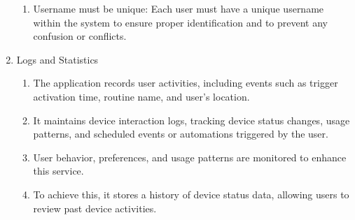 \begin{enumerate}[label=\arabic*.]
\begin{enumerate}[label*={\arabic*.},ref=\theenumi.\arabic*]
                  \item Username must be unique: Each user must have a unique username within the system to ensure proper identification and to prevent any confusion or conflicts.\\
            \end{enumerate}

      \item {\large{Logs and Statistics}}\\
            \begin{enumerate}[label*={\arabic*.},ref=\theenumi.\arabic*]
                  \setlength{\itemindent}{0.5cm}
                  \item The application records user activities, including events such as trigger activation time, routine name, and user's location. \\

                  \item It maintains device interaction logs, tracking device status changes, usage patterns, and scheduled events or automations triggered by the user. \\


                  \item User behavior, preferences, and usage patterns are monitored to enhance this service. \\

                  \item To achieve this, it stores a history of device status data, allowing users to review past device activities.\\
            \end{enumerate}



\end{enumerate}
